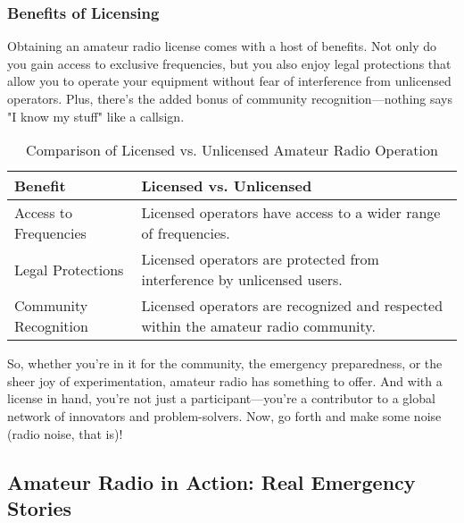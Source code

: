
\subsubsection*{Benefits of Licensing}
Obtaining an amateur radio license comes with a host of benefits. Not only do you gain access to exclusive frequencies, but you also enjoy legal protections that allow you to operate your equipment without fear of interference from unlicensed operators. Plus, there's the added bonus of community recognition—nothing says "I know my stuff" like a callsign.

\begin{table}[h]
    \centering
    \begin{tabular}{|l|l|}
        \hline
        \textbf{Benefit} & \textbf{Licensed vs. Unlicensed} \\
        \hline
        Access to Frequencies & Licensed operators have access to a wider range of frequencies. \\
        Legal Protections & Licensed operators are protected from interference by unlicensed users. \\
        Community Recognition & Licensed operators are recognized and respected within the amateur radio community. \\
        \hline
    \end{tabular}
    \caption{Comparison of Licensed vs. Unlicensed Amateur Radio Operation}
    \label{tab:licensed-vs-unlicensed}
\end{table}

So, whether you're in it for the community, the emergency preparedness, or the sheer joy of experimentation, amateur radio has something to offer. And with a license in hand, you're not just a participant—you're a contributor to a global network of innovators and problem-solvers. Now, go forth and make some noise (radio noise, that is)!



\subsection{Amateur Radio in Action: Real Emergency Stories}
\label{subsec:emergency-stories}

